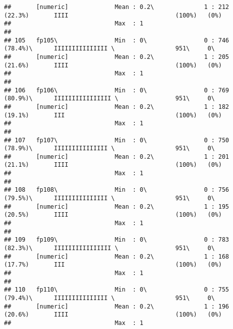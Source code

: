 \documentclass[]{article}
\begin{document}
\begin{verbatim}
##       [numeric]             Mean : 0.2\              1 : 212 (22.3%)       IIII                              (100%)   (0%)     
##                             Max  : 1                                                                                           
## 
## 105   fp105\                Min  : 0\                0 : 746 (78.4%)\      IIIIIIIIIIIIIII \                 951\     0\       
##       [numeric]             Mean : 0.2\              1 : 205 (21.6%)       IIII                              (100%)   (0%)     
##                             Max  : 1                                                                                           
## 
## 106   fp106\                Min  : 0\                0 : 769 (80.9%)\      IIIIIIIIIIIIIIII \                951\     0\       
##       [numeric]             Mean : 0.2\              1 : 182 (19.1%)       III                               (100%)   (0%)     
##                             Max  : 1                                                                                           
## 
## 107   fp107\                Min  : 0\                0 : 750 (78.9%)\      IIIIIIIIIIIIIII \                 951\     0\       
##       [numeric]             Mean : 0.2\              1 : 201 (21.1%)       IIII                              (100%)   (0%)     
##                             Max  : 1                                                                                           
## 
## 108   fp108\                Min  : 0\                0 : 756 (79.5%)\      IIIIIIIIIIIIIII \                 951\     0\       
##       [numeric]             Mean : 0.2\              1 : 195 (20.5%)       IIII                              (100%)   (0%)     
##                             Max  : 1                                                                                           
## 
## 109   fp109\                Min  : 0\                0 : 783 (82.3%)\      IIIIIIIIIIIIIIII \                951\     0\       
##       [numeric]             Mean : 0.2\              1 : 168 (17.7%)       III                               (100%)   (0%)     
##                             Max  : 1                                                                                           
## 
## 110   fp110\                Min  : 0\                0 : 755 (79.4%)\      IIIIIIIIIIIIIII \                 951\     0\       
##       [numeric]             Mean : 0.2\              1 : 196 (20.6%)       IIII                              (100%)   (0%)     
##                             Max  : 1                                                                                           

\end{verbatim}
\end{document}
